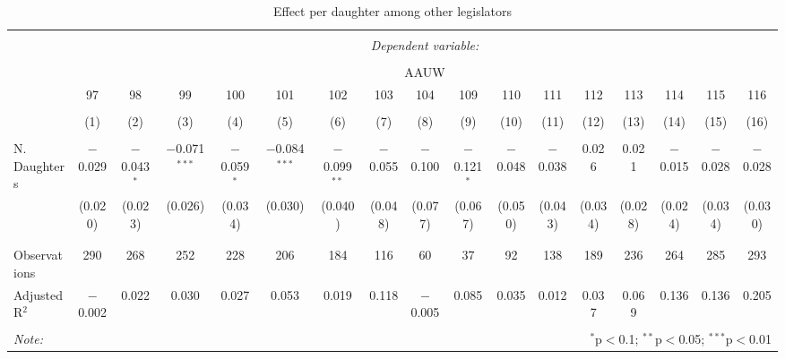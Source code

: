 
\begin{table}[!htbp] \centering 
  \caption{Effect per daughter among other legislators} 
  \label{} 
\begin{tabular}{@{\extracolsep{5pt}}lcccccccccccccccc} 
\\[-1.8ex]\hline 
\hline \\[-1.8ex] 
 & \multicolumn{16}{c}{\textit{Dependent variable:}} \\ 
\cline{2-17} 
\\[-1.8ex] & \multicolumn{16}{c}{AAUW} \\ 
 & 97 & 98 & 99 & 100 & 101 & 102 & 103 & 104 & 109 & 110 & 111 & 112 & 113 & 114 & 115 & 116 \\ 
\\[-1.8ex] & (1) & (2) & (3) & (4) & (5) & (6) & (7) & (8) & (9) & (10) & (11) & (12) & (13) & (14) & (15) & (16)\\ 
\hline \\[-1.8ex] 
 N. Daughters & $-$0.029 & $-$0.043$^{*}$ & $-$0.071$^{***}$ & $-$0.059$^{*}$ & $-$0.084$^{***}$ & $-$0.099$^{**}$ & $-$0.055 & $-$0.100 & $-$0.121$^{*}$ & $-$0.048 & $-$0.038 & 0.026 & 0.021 & $-$0.015 & $-$0.028 & $-$0.028 \\ 
  & (0.020) & (0.023) & (0.026) & (0.034) & (0.030) & (0.040) & (0.048) & (0.077) & (0.067) & (0.050) & (0.043) & (0.034) & (0.028) & (0.024) & (0.034) & (0.030) \\ 
  & & & & & & & & & & & & & & & & \\ 
\hline \\[-1.8ex] 
Observations & 290 & 268 & 252 & 228 & 206 & 184 & 116 & 60 & 37 & 92 & 138 & 189 & 236 & 264 & 285 & 293 \\ 
Adjusted R$^{2}$ & $-$0.002 & 0.022 & 0.030 & 0.027 & 0.053 & 0.019 & 0.118 & $-$0.005 & 0.085 & 0.035 & 0.012 & 0.037 & 0.069 & 0.136 & 0.136 & 0.205 \\ 
\hline 
\hline \\[-1.8ex] 
\textit{Note:}  & \multicolumn{16}{r}{$^{*}$p$<$0.1; $^{**}$p$<$0.05; $^{***}$p$<$0.01} \\ 
\end{tabular} 
\end{table} 
